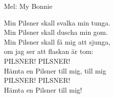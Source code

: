 \begin{SongText}
    \begin{SongInfo}
        Mel: My Bonnie
    \end{SongInfo}
    \begin{SongVerse}
        Min Pilsner skall svalka min tunga.\\%
        Min Pilsner skall duscha min gom.\\%
        Min Pilsner skall få mig att sjunga,\\%
        om jag ser att flaskan är tom:\\%
        PILSNER! PILSNER!\\%
        Hämta en Pilsner till mig, till mig\\%
        PILSNER! PILSNER!\\%
        Hämta en Pilsner till mig!
    \end{SongVerse}
\end{SongText}
